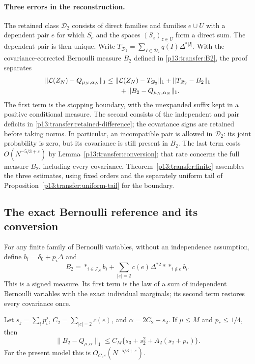 \paragraph{Three errors in the reconstruction.}
The retained class \(\mathscr D_2\) consists of direct families and
families \(e\cup U\) with a dependent pair \(e\) for which
\(S_e\) and the spaces \((S_z)_{z\in U}\) form a direct sum.
The dependent pair is then unique. Write
\(T_{\mathscr D_2}=\sum_{I\in\mathscr D_2}q(I)\Delta^{*|I|}\).
With the covariance-corrected Bernoulli measure \(B_2\) defined in
\eqref{p13:transfer:B2}, the proof separates
\[
 \begin{aligned}
 \|\mathcal L(Z_N)-Q_{\mu_N,\alpha_N}\|_1
 &\le \|\mathcal L(Z_N)-T_{\mathscr D_2}\|_1
       +\|T_{\mathscr D_2}-B_2\|_1\\
 &\qquad +\|B_2-Q_{\mu_N,\alpha_N}\|_1.
 \end{aligned}
\]
The first term is the stopping boundary, with the unexpanded suffix
kept in a positive conditional measure. The second consists of the
independent and pair deficits in
\eqref{p13:transfer:retained-difference}; the covariance signs are
retained before taking norms. In particular, an incompatible pair
is allowed in \(\mathscr D_2\): its joint probability is zero,
but its covariance is still present in \(B_2\).
The last term costs \(O(N^{-5/3+\varepsilon})\) by
Lemma~\ref{p13:transfer:conversion}; that rate concerns the full
measure \(B_2\), including every covariance.
Theorem~\ref{p13:transfer:finite} assembles the three estimates,
using fixed orders and the separately uniform tail of
Proposition~\ref{p13:transfer:uniform-tail} for the boundary.

\subsection{The exact Bernoulli reference and its conversion}

For any finite family of Bernoulli variables, without an independence
assumption, define $b_i=\delta_0+p_i\Delta$ and
\begin{equation}
 B_2=\mathop{*}_{i\in\mathcal I_N}b_i
       +\sum_{|e|=2}c(e)\Delta^{*2}*
                     \mathop{*}_{i\notin e}b_i.
 \label{p13:transfer:B2}
\end{equation}
This is a signed measure. Its first term is the law of a sum of
independent Bernoulli variables with the exact individual marginals;
its second term restores every covariance once.

\begin{lemma}
\label{p13:transfer:conversion}
Let $s_j=\sum_i p_i^j$, $C_2=\sum_{|e|=2}c(e)$, and
$\alpha=2C_2-s_2$. If $\mu\leq M$ and $p_*\leq1/4$, then
\begin{equation}
 \|B_2-Q_{\mu,\alpha}\|_1
 \leq C_M\{s_3+s_2^2+A_2(s_2+p_*)\}.
 \label{p13:transfer:conversion-bound}
\end{equation}
For the present model this is $O_{C,\varepsilon}(N^{-5/3+\varepsilon})$.
\end{lemma}


